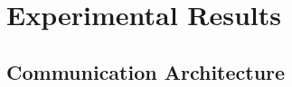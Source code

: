 %
%


\section{Experimental Results}\label{sec:results}





\subsection{Communication Architecture}\label{sec:comm}

